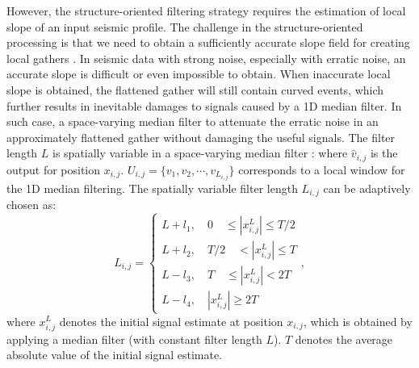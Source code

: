 However, the structure-oriented filtering strategy requires the estimation of  local slope of an input seismic profile. The challenge in the structure-oriented processing is that we need to obtain a sufficiently accurate slope field for creating  local gathers \cite[]{sosvmf}. In seismic data with strong noise, especially with erratic noise, an accurate slope is difficult or even impossible to obtain.  When  inaccurate local slope is obtained, the flattened gather will still contain curved events, which further results in inevitable damages to signals caused by a 1D median filter. In such case,  a space-varying median filter to attenuate the erratic noise in an approximately flattened gather without damaging the useful signals. The filter length $L$ is spatially variable in a space-varying median filter \cite[]{yangkang2015svmf}:
where $\hat{v}_{i,j}$ is the output for position $x_{i,j}$. $U_{i,j}=\{v_1,v_2,\cdots,v_{L_{i,j}}\}$ corresponds to a local window for the 1D median filtering.
The spatially variable filter length $L_{i,j}$ can be adaptively chosen as:
\begin{equation}
\label{eq:svmf3}
L_{i,j}=\left\{\begin{array}{ll}
L+l_1,\quad 0\quad \le |x^L_{i,j}|\le T/2 \\
L+l_2,\quad T/2\quad <|x^L_{i,j}|\le T \\
L-l_3,\quad T \quad \le|x^L_{i,j}| < 2T\\
L-l_4,\quad |x^L_{i,j}| \ge 2T
\end{array}\right.,
\end{equation}
where $x^L_{i,j}$ denotes the initial signal estimate at position $x_{i,j}$, which is obtained by applying a median filter (with constant filter length $L$). $T$ denotes the average absolute value of the initial signal estimate. 

